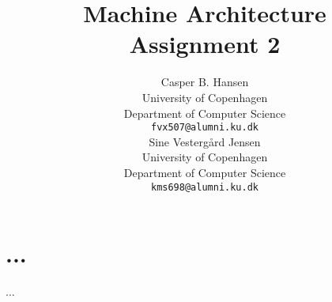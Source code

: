 \documentclass[11pt,a4paper]{article}
\title
{
	Machine Architecture\\
	\Large Assignment 2
}
\author
{
	Casper B. Hansen\\
	University of Copenhagen\\
	Department of Computer Science\\
	{\tt fvx507@alumni.ku.dk} \\
	Sine Vestergård Jensen\\
	University of Copenhagen\\
	Department of Computer Science\\
	{\tt kms698@alumni.ku.dk}
}
\begin{document}
\maketitle

\section*{...}
...
\end{document}
